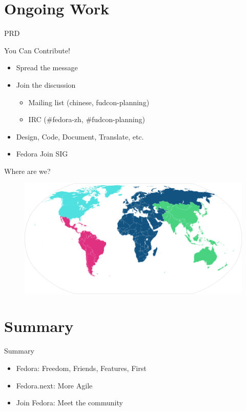 \documentclass{beamer}
\begin{document}
\section{Ongoing Work}

\begin{frame}{PRD}
\end{frame}

\begin{frame}{You Can Contribute!}
  \begin{itemize}
    \item Spread the message
    \item Join the discussion
      \begin{itemize}
        \item Mailing list (chinese, fudcon-planning)
        \item IRC (\#fedora-zh, \#fudcon-planning)
      \end{itemize}
    \item Design, Code, Document, Translate, etc.
    \item Fedora Join SIG
  \end{itemize}
\end{frame}

\begin{frame}{Where are we?}
  \begin{figure}[htbp]
    \centering
    \includegraphics[width=\textwidth]{Ambassador-World-Map.png}
  \end{figure}
\end{frame}

\section*{Summary}

\begin{frame}{Summary}
  \begin{itemize}
  \item Fedora: Freedom, Friends, Features, First
  \item Fedora.next: More Agile
  \item Join Fedora: Meet the community
  \end{itemize}
\end{frame}
\end{document}
